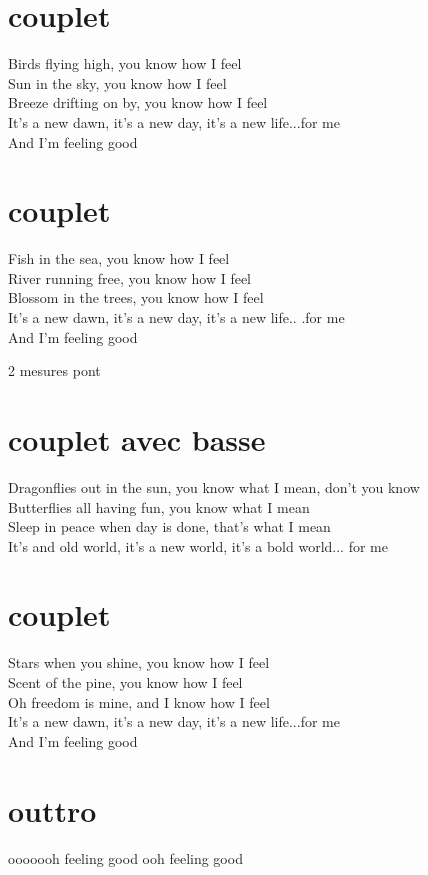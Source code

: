 \section*{couplet}
Birds flying high, you know how I feel \\
Sun in the sky, you know how I feel \\
Breeze drifting on by, you know how I feel\\
It's a new dawn, it's a new day, it's a new life...for me\\
And I'm feeling good


\section*{couplet}
Fish in the sea, you know how I feel\\
River running free, you know how I feel\\
Blossom in the trees, you know how I feel\\
It's a new dawn, it's a new day, it's a new life..  .for me\\
And I'm feeling good

2 mesures pont

\section*{couplet avec basse}

Dragonflies out in the sun, you know what I mean, don't you know\\
Butterflies all having fun, you know what I mean\\
Sleep in peace when day is done, that's what I mean\\
It's and old world, it's a new world, it's a bold world...  for me

\section*{couplet}
Stars when you shine, you know how I feel\\
Scent of the pine, you know how I feel\\
Oh freedom is mine, and I know how I feel\\
It's a new dawn, it's a new day, it's a new life...for me\\
And I'm feeling good

\section*{outtro}
ooooooh feeling good ooh feeling good
